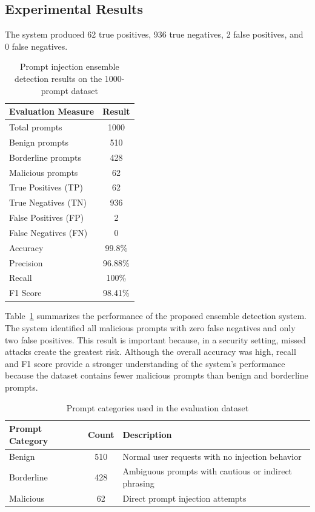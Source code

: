 \documentclass[10pt,leqno]{amsart}
\begin{document}
\subsection{Experimental Results}

The system produced 62 true positives, 936 true negatives, 2 false positives, and 0 false negatives.

\medskip
\begin{table}[h]
\centering
\caption{Prompt injection ensemble detection results on the 1000-prompt dataset}
\label{tab:ensemble-results}
\begin{tabular}{l c}
\hline
\textbf{Evaluation Measure} & \textbf{Result} \\
\hline
Total prompts & 1000 \\
Benign prompts & 510 \\
Borderline prompts & 428 \\
Malicious prompts & 62 \\
True Positives (TP) & 62 \\
True Negatives (TN) & 936 \\
False Positives (FP) & 2 \\
False Negatives (FN) & 0 \\
Accuracy & 99.8\% \\
Precision & 96.88\% \\
Recall & 100\% \\
F1 Score & 98.41\% \\
\hline
\end{tabular}
\end{table}
Table~\ref{tab:ensemble-results} summarizes the performance of the proposed ensemble detection system. The system identified all malicious prompts with zero false negatives and only two false positives. This result is important because, in a security setting, missed attacks create the greatest risk. Although the overall accuracy was high, recall and F1 score provide a stronger understanding of the system's performance because the dataset contains fewer malicious prompts than benign and borderline prompts.

\medskip
\begin{table}[h]
\centering
\caption{Prompt categories used in the evaluation dataset}
\label{tab:prompt-categories}
\begin{tabular}{l c l}
\hline
\textbf{Prompt Category} & \textbf{Count} & \textbf{Description} \\
\hline
Benign & 510 & Normal user requests with no injection behavior \\
Borderline & 428 & Ambiguous prompts with cautious or indirect phrasing \\
Malicious & 62 & Direct prompt injection attempts \\
\hline
\end{tabular}
\end{table}
\end{document}
